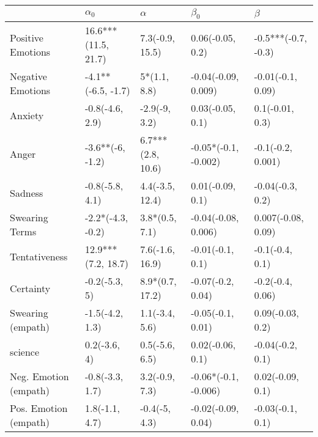 \begin{tabular}{lllll}
\toprule
{} &           $\alpha_0$ &           $\alpha$ &             $\beta_0$ &              $\beta$ \\
\midrule
Positive Emotions     &  16.6***(11.5, 21.7) &    7.3(-0.9, 15.5) &      0.06(-0.05, 0.2) &  -0.5***(-0.7, -0.3) \\
Negative Emotions     &   -4.1**(-6.5, -1.7) &       5*(1.1, 8.8) &   -0.04(-0.09, 0.009) &    -0.01(-0.1, 0.09) \\
Anxiety               &      -0.8(-4.6, 2.9) &      -2.9(-9, 3.2) &      0.03(-0.05, 0.1) &      0.1(-0.01, 0.3) \\
Anger                 &     -3.6**(-6, -1.2) &  6.7***(2.8, 10.6) &  -0.05*(-0.1, -0.002) &    -0.1(-0.2, 0.001) \\
Sadness               &      -0.8(-5.8, 4.1) &    4.4(-3.5, 12.4) &      0.01(-0.09, 0.1) &     -0.04(-0.3, 0.2) \\
Swearing Terms        &    -2.2*(-4.3, -0.2) &     3.8*(0.5, 7.1) &   -0.04(-0.08, 0.006) &   0.007(-0.08, 0.09) \\
Tentativeness         &   12.9***(7.2, 18.7) &    7.6(-1.6, 16.9) &      -0.01(-0.1, 0.1) &      -0.1(-0.4, 0.1) \\
Certainty             &        -0.2(-5.3, 5) &    8.9*(0.7, 17.2) &     -0.07(-0.2, 0.04) &     -0.2(-0.4, 0.06) \\
Swearing (empath)     &      -1.5(-4.2, 1.3) &     1.1(-3.4, 5.6) &     -0.05(-0.1, 0.01) &     0.09(-0.03, 0.2) \\
science               &         0.2(-3.6, 4) &     0.5(-5.6, 6.5) &      0.02(-0.06, 0.1) &     -0.04(-0.2, 0.1) \\
Neg. Emotion (empath) &      -0.8(-3.3, 1.7) &     3.2(-0.9, 7.3) &  -0.06*(-0.1, -0.006) &     0.02(-0.09, 0.1) \\
Pos. Emotion (empath) &       1.8(-1.1, 4.7) &      -0.4(-5, 4.3) &    -0.02(-0.09, 0.04) &     -0.03(-0.1, 0.1) \\
\bottomrule
\end{tabular}
